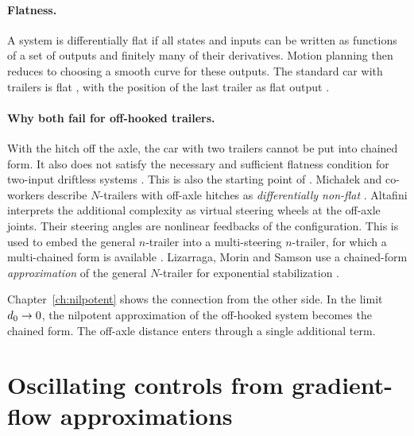 \paragraph{Flatness.}
A system is differentially flat if all states and inputs can be written as
functions of a set of outputs and finitely many of their derivatives. Motion
planning then reduces to choosing a smooth curve for these outputs. The
standard car with trailers is flat \cite{rouchon1993}, with the position of
the last trailer as flat output \cite{michalek2014tcst}.
\TODO[Check whether the car with ONE off-hooked trailer is flat (Rouchon et al. 1993 may treat it); if so, say that flatness-based planning exists for r = 3 but not for two off-hooked trailers]

\paragraph{Why both fail for off-hooked trailers.}
With the hitch off the axle, the car with two trailers cannot be put into
chained form. It also does not satisfy the necessary and sufficient flatness
condition for two-input driftless systems \cite{vendittelli1998}. This is also
the starting point of \cite{zuyev2024}. Michałek and co-workers describe
$N$-trailers with off-axle hitches as \emph{differentially non-flat}
\cite{michalek2015jint}. Altafini interprets the additional complexity as
virtual steering wheels at the off-axle joints. Their steering angles are
nonlinear feedbacks of the configuration. This is used to embed the general
$n$-trailer into a multi-steering $n$-trailer, for which a multi-chained form is
available \cite{altafini2001}. Lizarraga, Morin and Samson use a chained-form
\emph{approximation} of the general $N$-trailer for exponential stabilization
\cite{lizarraga2001}.

Chapter~\ref{ch:nilpotent} shows the connection from the other side. In the
limit $d_0\to0$, the nilpotent approximation of the off-hooked system becomes
the chained form. The off-axle distance enters through a single additional term.

\section{Oscillating controls from gradient-flow approximations}
\label{sec:bg-oscillating}

